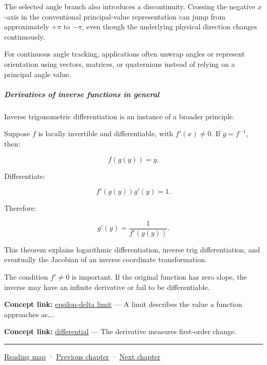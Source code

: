 The selected angle branch also introduces a discontinuity. Crossing the negative \(x\)-axis in the conventional principal-value representation can jump from approximately \(+\pi\) to \(-\pi\), even though the underlying physical direction changes continuously.

For continuous angle tracking, applications often unwrap angles or represent orientation using vectors, matrices, or quaternions instead of relying on a principal angle value.

\subparagraph{Derivatives of inverse functions in general}\label{01-foundations-i-ch020-derivatives-of-inverse-functions-in-general}

\hypertarget{01-foundations-i-ch020-derivatives-of-inverse-functions-in-general}{}

Inverse trigonometric differentiation is an instance of a broader principle.

Suppose \(f\) is locally invertible and differentiable, with \(f'(x)\ne0\). If \(g=f^{-1}\), then:

\[
f(g(y))=y.
\]

Differentiate:

\[
f'(g(y))g'(y)=1.
\]

Therefore:

\[
\boxed{g'(y)=\frac1{f'(g(y))}}.
\]

This theorem explains logarithmic differentiation, inverse trig differentiation, and eventually the Jacobian of an inverse coordinate transformation.

The condition \(f'\ne0\) is important. If the original function has zero slope, the inverse may have an infinite derivative or fail to be differentiable.

\textbf{Concept link:} \hyperref[01-foundations-i-ch020-functions-limits-continuity-and-scalar-change]{epsilon-delta limit} --- A limit describes the value a function approaches as\ldots.

\textbf{Concept link:} \hyperref[01-foundations-i-ch020-functions-limits-continuity-and-scalar-change]{differential} --- The derivative measures first-order change.

\begin{center}\rule{0.5\linewidth}{0.5pt}\end{center}

\hyperref[volume-reading-map]{Reading map} · \hyperref[01-foundations-i-ch019-coordinate-frames-and-linear-systems]{Previous chapter} · \hyperref[02-foundations-ii-ch021-multivariable-derivatives-and-sensitivity]{Next chapter}
